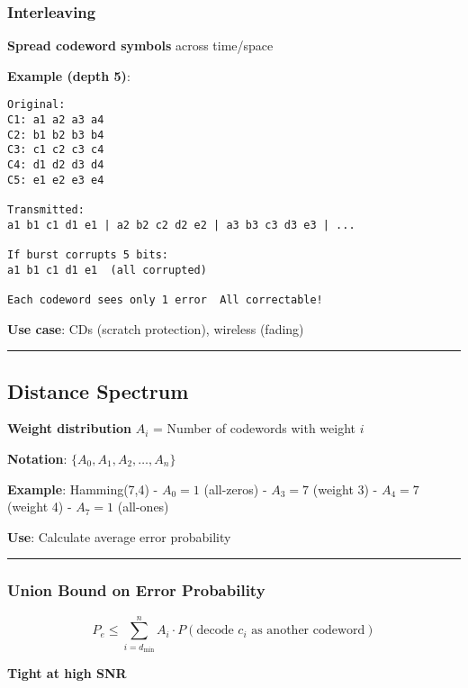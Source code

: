 \subsubsection{Interleaving}\label{interleaving}

\textbf{Spread codeword symbols} across time/space

\textbf{Example (depth 5)}:

\begin{verbatim}
Original:
C1: a1 a2 a3 a4
C2: b1 b2 b3 b4
C3: c1 c2 c3 c4
C4: d1 d2 d3 d4
C5: e1 e2 e3 e4

Transmitted:
a1 b1 c1 d1 e1 | a2 b2 c2 d2 e2 | a3 b3 c3 d3 e3 | ...

If burst corrupts 5 bits:
a1 b1 c1 d1 e1  (all corrupted)
         
Each codeword sees only 1 error  All correctable!
\end{verbatim}

\textbf{Use case}: CDs (scratch protection), wireless (fading)

\begin{center}\rule{0.5\linewidth}{0.5pt}\end{center}

\subsection{Distance Spectrum}\label{distance-spectrum}

\textbf{Weight distribution} \(A_i\) = Number of codewords with weight
\(i\)

\textbf{Notation}: \(\{A_0, A_1, A_2, \ldots, A_n\}\)

\textbf{Example}: Hamming(7,4) - \(A_0 = 1\) (all-zeros) - \(A_3 = 7\)
(weight 3) - \(A_4 = 7\) (weight 4) - \(A_7 = 1\) (all-ones)

\textbf{Use}: Calculate average error probability

\begin{center}\rule{0.5\linewidth}{0.5pt}\end{center}

\subsubsection{Union Bound on Error
Probability}\label{union-bound-on-error-probability}

\[
P_e \leq \sum_{i=d_{\min}}^{n} A_i \cdot P(\text{decode } c_i \text{ as another codeword})
\]

\textbf{Tight at high SNR}

